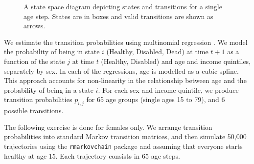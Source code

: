 \documentclass{article}
\begin{document}
\begin{figure}[t!]\centering
{}
\caption{A state space diagram depicting states and transitions for a single age step. States are in boxes and valid transitions are shown as arrows.}
\label{fig:statespace}
\end{figure}

We estimate the transition probabilities using multinomial regression \citep{Allison1982}. We model the probability of being in state $i$ (Healthy, Disabled, Dead) at time $t + 1$ as a function of the state $j$ at time $t$ (Healthy, Disabled) and age and income quintiles, separately by sex. In each of the regressions, age is modelled as a cubic spline. This approach accounts for non-linearity in the relationship between age and the probability of being in a state $i$. For each sex and income quintile, we produce transition probabilities $p_{i,j}$ for 65 age groups (single ages 15 to 79), and 6 possible transitions.

The following exercise is done for females only. We arrange transition probabilities into standard Markov transition matrices, and then simulate 50,000 trajectories using the \texttt{rmarkovchain} package \citep{spedicato2017} and assuming that everyone starts healthy at age 15. Each trajectory consists in 65 age steps.
\end{document}
